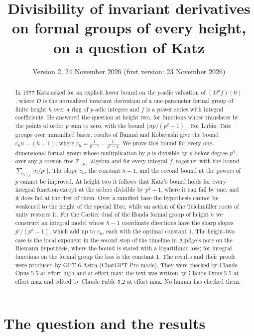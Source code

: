 \documentclass[11pt]{amsart}
\title[Invariant derivatives at every height]{Divisibility of invariant derivatives on formal groups of every height, on a question of Katz}
\author{}
\date{Version 2, 24 November 2026 (first version: 23 November 2026)}
\theoremstyle{definition}
\theoremstyle{remark}
\newcommand{\Z}{\mathbb Z}
\begin{document}
\begin{abstract}
In 1977 Katz asked for an explicit lower bound on the $p$-adic valuation of $(D^nf)(0)$, where $D$ is the normalized invariant derivation of a one-parameter formal group of finite height $h$ over a ring of $p$-adic integers and $f$ is a power series with integral coefficients. He answered the question at height two, for functions whose translates by the points of order $p$ sum to zero, with the bound $\lfloor np/(p^2-1)\rfloor$. For Lubin--Tate groups over unramified bases, results of Bannai and Kobayashi give the bound $c_hn-(h-1)$, where $c_h=\frac1{p-1}-\frac1{p^h-1}$. We prove this bound for every one-dimensional formal group whose multiplication by $p$ is divisible by $p$ below degree $p^h$, over any $p$-torsion-free $\Z_{(p)}$-algebra and for every integral $f$, together with the bound $\sum_{h\nmid j}\lfloor n/p^j\rfloor$. The slope $c_h$, the constant $h-1$, and the second bound at the powers of $p$ cannot be improved. At height two it follows that Katz's bound holds for every integral function except at the orders divisible by $p^2-1$, where it can fail by one, and it does fail at the first of them. Over a ramified base the hypothesis cannot be weakened to the height of the special fibre, while an action of the Teichm\"uller roots of unity restores it. For the Cartier dual of the Honda formal group of height $h$ we construct an integral model whose $h-1$ coordinate directions have the sharp slopes $p^i/(p^h-1)$, which add up to $c_h$, each with the optimal constant $1$. The height-two case is the local exponent in the second step of the timeline in Alp\"oge's note on the Riemann hypothesis, where the bound is stated with a logarithmic loss; for integral functions on the formal group the loss is the constant $1$. The results and their proofs were produced by GPT-6 Astra (ChatGPT Pro mode). They were checked by Claude Opus 5.5 at effort high and at effort max; the text was written by Claude Opus 5.5 at effort max and edited by Claude Fable 5.2 at effort max. No human has checked them.
\end{abstract}

\maketitle

\section{The question and the results}
\end{document}
